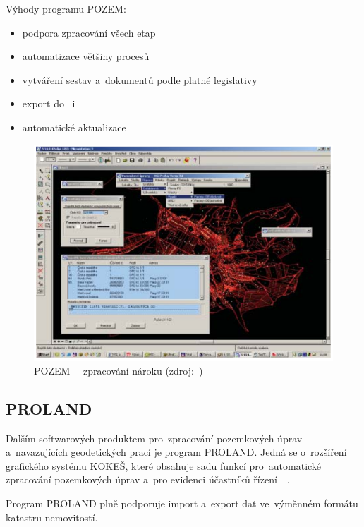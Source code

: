 Výhody programu POZEM:
\vspace{-\topsep}
	\begin{itemize}[leftmargin=1.5cm, noitemsep]
		\item podpora zpracování všech etap 
		\item automatizace většiny procesů 
		\item vytváření sestav a~dokumentů podle platné legislativy
		\item export do~ i~
		\item automatické aktualizace
	\end{itemize}

	\begin{figure}[H]
		\centering
		\includegraphics[width=.8\textwidth]{./pictures/pozem.png}
		\caption[POZEM~– zpracování nároku]{POZEM~– zpracování nároku (zdroj:~\cite{pozem})}
		\label{fig:pozem_obrazek}
 	\end{figure}

\subsection{PROLAND}
\label{proland}

Dalším softwarových produktem pro~zpracování pozemkových úprav a~navazujících geodetických prací je program PROLAND. Jedná se o~rozšíření grafického systému KOKEŠ, které obsahuje sadu funkcí pro~automatické zpracování pozemkových úprav a~pro evidenci účastníků řízení~\citep{proland}~\citep{pu_skripta}.

Program PROLAND plně podporuje import a~export dat ve~výměnném formátu katastru nemovitostí.

